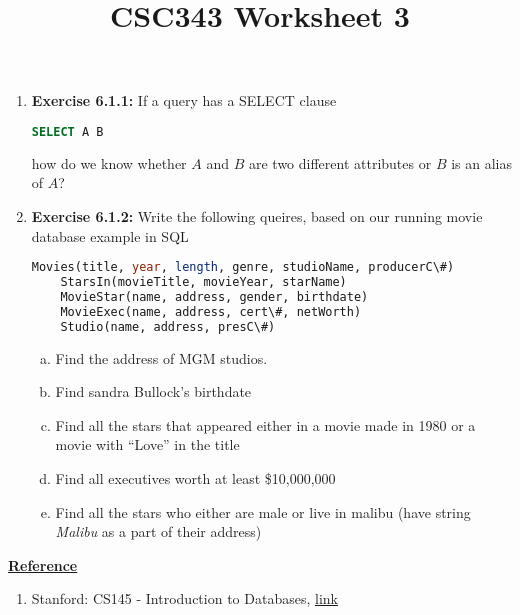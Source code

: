\documentclass[12pt]{article}
\begin{document}
\title{CSC343 Worksheet 3}
\maketitle

\bigskip


\begin{enumerate}[1.]
   \item \textbf{Exercise 6.1.1:} If a query has a SELECT clause

   \begin{lstlisting}[language=SQL]
    SELECT A B
    \end{lstlisting}

    how do we know whether $A$ and $B$ are two different attributes or $B$ is an
    alias of $A$?

    \item \textbf{Exercise 6.1.2:} Write the following queires, based on our running movie
    database example in SQL

    \begin{lstlisting}[language=SQL]
    Movies(title, year, length, genre, studioName, producerC\#)
    StarsIn(movieTitle, movieYear, starName)
    MovieStar(name, address, gender, birthdate)
    MovieExec(name, address, cert\#, netWorth)
    Studio(name, address, presC\#)
    \end{lstlisting}

    \bigskip

    \begin{enumerate}[a)]
        \item Find the address of MGM studios.
        \item Find sandra Bullock's birthdate
        \item Find all the stars that appeared either in a movie made in 1980 or a movie with ``Love'' in the title
        \item Find all executives worth at least \$10,000,000
        \item Find all the stars who either are male or live in malibu (have
        string \textit{Malibu} as a part of their address)
    \end{enumerate}

\end{enumerate}

\bigskip

\underline{\textbf{Reference}}

\bigskip

\begin{enumerate}[1)]
    \item Stanford: CS145 - Introduction to Databases, \href{http://infolab.stanford.edu/~ullman/fcdb/aut07/index.html}{link}
\end{enumerate}
\end{document}
